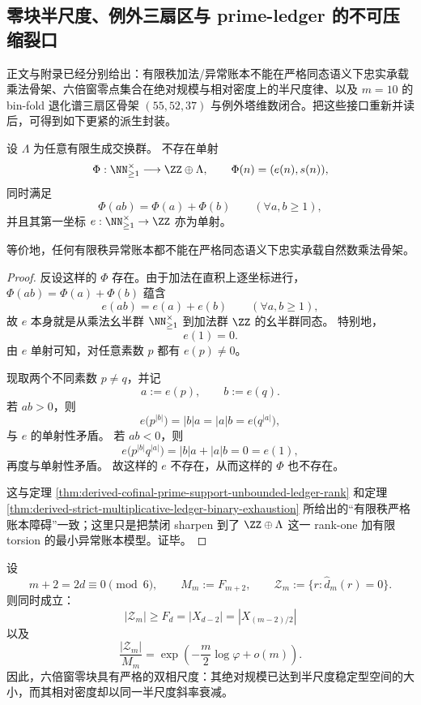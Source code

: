 \subsection{零块半尺度、例外三扇区与 prime-ledger 的不可压缩裂口}

正文与附录已经分别给出：有限秩加法/异常账本不能在严格同态语义下忠实承载乘法骨架、六倍窗零点集合在绝对规模与相对密度上的半尺度律、以及 \(m=10\) 的 bin-fold 退化谱三扇区骨架 \((55,52,37)\) 与例外塔维数闭合。把这些接口重新并读后，可得到如下更紧的派生封装。

\begin{theorem}[有限异常账本不能忠实同态化乘法骨架]\label{thm:derived-finite-anomaly-ledger-no-faithful-multiplicative-skeleton}
设 \(\Lambda\) 为任意有限生成交换群。
不存在单射
\[
\Phi:\NN_{\ge 1}^{\times}\longrightarrow \ZZ\oplus \Lambda,
\qquad
\Phi(n)=(e(n),s(n)),
\]
同时满足
\[
\Phi(ab)=\Phi(a)+\Phi(b)
\qquad
(\forall a,b\ge 1),
\]
并且其第一坐标 \(e:\NN_{\ge 1}^{\times}\to \ZZ\) 亦为单射。

等价地，任何有限秩异常账本都不能在严格同态语义下忠实承载自然数乘法骨架。
\end{theorem}

\begin{proof}
反设这样的 \(\Phi\) 存在。由于加法在直积上逐坐标进行，\(\Phi(ab)=\Phi(a)+\Phi(b)\) 蕴含
\[
e(ab)=e(a)+e(b)
\qquad
(\forall a,b\ge 1),
\]
故 \(e\) 本身就是从乘法幺半群 \(\NN_{\ge 1}^{\times}\) 到加法群 \(\ZZ\) 的幺半群同态。
特别地，
\[
e(1)=0.
\]
由 \(e\) 单射可知，对任意素数 \(p\) 都有 \(e(p)\neq 0\)。

现取两个不同素数 \(p\neq q\)，并记
\[
a:=e(p),\qquad b:=e(q).
\]
若 \(ab>0\)，则
\[
e\!\bigl(p^{|b|}\bigr)=|b|a=|a|b=e\!\bigl(q^{|a|}\bigr),
\]
与 \(e\) 的单射性矛盾。
若 \(ab<0\)，则
\[
e\!\bigl(p^{|b|}q^{|a|}\bigr)=|b|a+|a|b=0=e(1),
\]
再度与单射性矛盾。
故这样的 \(e\) 不存在，从而这样的 \(\Phi\) 也不存在。

这与定理 \ref{thm:derived-cofinal-prime-support-unbounded-ledger-rank} 和定理
\ref{thm:derived-strict-multiplicative-ledger-binary-exhaustion}
所给出的“有限秩严格账本障碍”一致；这里只是把禁闭 sharpen 到了 \(\ZZ\oplus \Lambda\) 这一 rank-one 加有限 torsion 的最小异常账本模型。证毕。
\end{proof}

\begin{theorem}[六倍窗零块的半尺度双相律]\label{thm:derived-window6-zero-block-dual-halfscale-law}
设
\[
m+2=2d\equiv 0\pmod 6,
\qquad
M_m:=F_{m+2},
\qquad
\mathcal Z_m:=\{r:\widehat d_m(r)=0\}.
\]
则同时成立：
\[
\boxed{\;
|\mathcal Z_m|\ge F_d=|X_{d-2}|=|X_{(m-2)/2}|\;}
\]
以及
\[
\boxed{\;
\frac{|\mathcal Z_m|}{M_m}
=
\exp\!\left(-\frac{m}{2}\log\varphi+o(m)\right).\;}
\]
因此，六倍窗零块具有严格的双相尺度：其绝对规模已达到半尺度稳定型空间的大小，而其相对密度却以同一半尺度斜率衰减。
\end{theorem}

